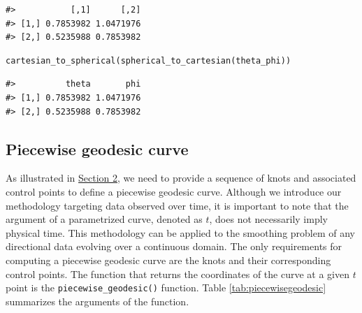 \begin{verbatim}
#>           [,1]      [,2]
#> [1,] 0.7853982 1.0471976
#> [2,] 0.5235988 0.7853982
\end{verbatim}

\begin{verbatim}
cartesian_to_spherical(spherical_to_cartesian(theta_phi))
\end{verbatim}

\begin{verbatim}
#>          theta       phi
#> [1,] 0.7853982 1.0471976
#> [2,] 0.5235988 0.7853982
\end{verbatim}

\subsection*{Piecewise geodesic curve}\label{piecewise-geodesic-curve-1}

As illustrated in \hyperref[prelim]{Section 2}, we need to provide a sequence of knots and associated control points to define a piecewise geodesic curve. Although we introduce our methodology targeting data observed over time, it is important to note that the argument of a parametrized curve, denoted as \(t\), does not necessarily imply physical time. This methodology can be applied to the smoothing problem of any directional data evolving over a continuous domain. The only requirements for computing a piecewise geodesic curve are the knots and their corresponding control points. The function that returns the coordinates of the curve at a given \(t\) point is the \texttt{piecewise\_geodesic()} function. Table \ref{tab:piecewisegeodesic} summarizes the arguments of the function.

